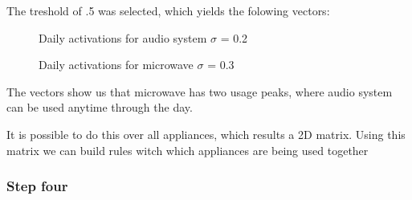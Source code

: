 The treshold of .5 was selected, which yields the folowing vectors:

\begin{figure}[H]
    \centering
    \caption{Daily activations for audio system $\sigma$ = 0.2}
    \label{arr:as_acts_vec}
\end{figure}

\begin{figure}[H]
    \centering
    \caption{Daily activations for microwave $\sigma$ = 0.3}
    \label{arr:microwave_acts_vec}
\end{figure}

The vectors show us that microwave has two usage peaks, where audio system can be used anytime through the day.

It is possible to do this over all appliances, which results a 2D matrix. 
Using this matrix we can build rules witch which appliances are being used together


\subsubsection{Step four}
